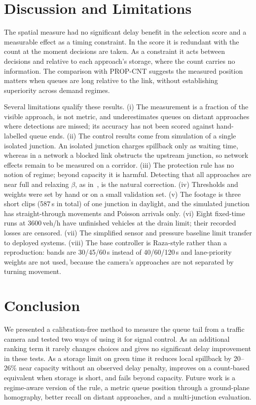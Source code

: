 \documentclass[conference]{IEEEtran}
\begin{document}
\section{Discussion and Limitations}
The spatial measure had no significant delay benefit in the selection score and a measurable effect as a
timing constraint. In the score it is redundant with the count at the moment decisions
are taken. As a constraint it acts between decisions and relative to each approach's
storage, where the count carries no information. The comparison with PROP-CNT suggests
the measured position matters when queues are long relative to the link, without establishing superiority across demand regimes.

Several limitations qualify these results. (i) The measurement is a fraction of the
visible approach, is not metric, and underestimates queues on distant approaches where
detections are missed; its accuracy has not been scored against hand-labelled queue ends.
(ii) The control results come from simulation of a single isolated junction. An isolated
junction charges spillback only as waiting time, whereas in a network a blocked link
obstructs the upstream junction, so network effects remain to be measured on a corridor. (iii) The protection rule has no
notion of regime; beyond capacity it is harmful. Detecting that all approaches are near
full and relaxing $\beta$, as in~\cite{mohajerpoor2023}, is the natural correction.
(iv) Thresholds and weights were set by hand or on a small validation set. (v) The
footage is three short clips (587\,s in total) of one junction in daylight, and the
simulated junction has straight-through movements and Poisson arrivals only. (vi) Eight fixed-time runs at 3600\,veh/h have unfinished vehicles at the drain limit; their recorded losses are censored. (vii) The simplified sensor and pressure baseline limit transfer to deployed systems. (viii) The base controller is Raza-style rather than a reproduction: bands are 30/45/60\,s instead of
40/60/120\,s and lane-priority weights are not used, because the camera's approaches are
not separated by turning movement.

\section{Conclusion}
We presented a calibration-free method to measure the queue tail from a traffic camera
and tested two ways of using it for signal control. As an additional ranking term it rarely changes choices and gives no significant delay improvement in these tests. As a
storage limit on green time it reduces local spillback by 20--26\% near capacity without an observed delay penalty, improves on a count-based equivalent when storage is short, and fails
beyond capacity. Future work is a regime-aware version of the rule, a metric queue
position through a ground-plane homography, better recall on distant approaches, and a
multi-junction evaluation.
\end{document}
